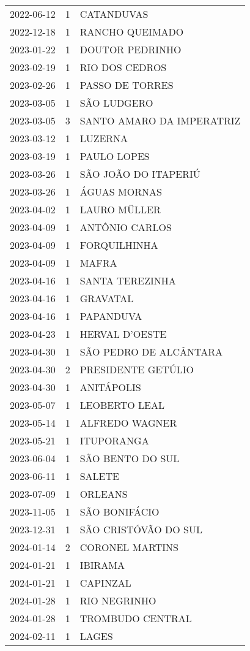 \begin{longtable}[htbp]{ccl}
2022-06-12 & 1 & CATANDUVAS \\
2022-12-18 & 1 & RANCHO QUEIMADO \\
2023-01-22 & 1 & DOUTOR PEDRINHO \\
2023-02-19 & 1 & RIO DOS CEDROS \\
2023-02-26 & 1 & PASSO DE TORRES \\
2023-03-05 & 1 & SÃO LUDGERO \\
2023-03-05 & 3 & SANTO AMARO DA IMPERATRIZ \\
2023-03-12 & 1 & LUZERNA \\
2023-03-19 & 1 & PAULO LOPES \\
2023-03-26 & 1 & SÃO JOÃO DO ITAPERIÚ \\
2023-03-26 & 1 & ÁGUAS MORNAS \\
2023-04-02 & 1 & LAURO MÜLLER \\
2023-04-09 & 1 & ANTÔNIO CARLOS \\
2023-04-09 & 1 & FORQUILHINHA \\
2023-04-09 & 1 & MAFRA \\
2023-04-16 & 1 & SANTA TEREZINHA \\
2023-04-16 & 1 & GRAVATAL \\
2023-04-16 & 1 & PAPANDUVA \\
2023-04-23 & 1 & HERVAL D'OESTE \\
2023-04-30 & 1 & SÃO PEDRO DE ALCÂNTARA \\
2023-04-30 & 2 & PRESIDENTE GETÚLIO \\
2023-04-30 & 1 & ANITÁPOLIS \\
2023-05-07 & 1 & LEOBERTO LEAL \\
2023-05-14 & 1 & ALFREDO WAGNER \\
2023-05-21 & 1 & ITUPORANGA \\
2023-06-04 & 1 & SÃO BENTO DO SUL \\
2023-06-11 & 1 & SALETE \\
2023-07-09 & 1 & ORLEANS \\
2023-11-05 & 1 & SÃO BONIFÁCIO \\
2023-12-31 & 1 & SÃO CRISTÓVÃO DO SUL \\
2024-01-14 & 2 & CORONEL MARTINS \\
2024-01-21 & 1 & IBIRAMA \\
2024-01-21 & 1 & CAPINZAL \\
2024-01-28 & 1 & RIO NEGRINHO \\
2024-01-28 & 1 & TROMBUDO CENTRAL \\
2024-02-11 & 1 & LAGES \\

\end{longtable}
